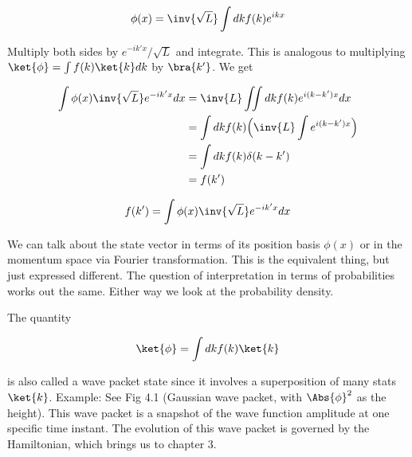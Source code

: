\begin{equation}\label{eqn:lecture5BigReviewCh2Operators:120}
\phi(x)
= \inv{\sqrt{L}} \int dk f(k) e^{ikx}
\end{equation}

Multiply both sides by \(e^{-ik'x}/\sqrt{L}\) and integrate.  This is analogous to multiplying \(\ket{\phi} = \int f(k) \ket{k} dk\) by \(\bra{k'}\).  We get

\begin{equation}\label{eqn:lecture5BigReviewCh2Operators:140}
\begin{aligned}
\int \phi(x) \inv{\sqrt{L}} e^{-ik'x} dx
&= \inv{L} \iint dk f(k) e^{i(k-k')x} dx \\
&= \int dk f(k) \Bigl( \inv{L} \int e^{i(k-k')x} \Bigr) \\
&= \int dk f(k) \delta(k-k') \\
&= f(k')
\end{aligned}
\end{equation}

\begin{equation}\label{eqn:lecture5BigReviewCh2Operators:160}
f(k') = \int \phi(x) \inv{\sqrt{L}} e^{-ik'x} dx
\end{equation}

We can talk about the state vector in terms of its position basis \(\phi(x)\) or in the momentum space via Fourier transformation.  This is the equivalent thing, but just expressed different.  The question of interpretation in terms of probabilities works out the same.  Either way we look at the probability density.

The quantity

\begin{equation}\label{eqn:lecture5BigReviewCh2Operators:180}
\ket{\phi} = \int dk f(k) \ket{k}
\end{equation}

is also called a wave packet state since it involves a superposition of many stats \(\ket{k}\).  Example: See Fig 4.1 (Gaussian wave packet, with \(\Abs{\phi}^2\) as the height).  This wave packet is a snapshot of the wave function amplitude at one specific time instant.  The evolution of this wave packet is governed by the Hamiltonian, which brings us to chapter 3.

